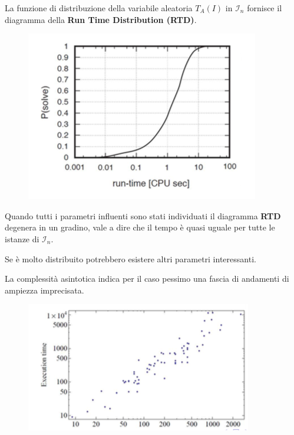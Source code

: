 \documentclass[\main/main.tex]{subfiles}
\begin{document}
\begin{multicols}{2}
\begin{definition}
    La funzione di distribuzione della variabile aleatoria \(T_A(I)\) in \(\mathcal{I}_n\) fornisce il diagramma della \textbf{Run Time Distribution (RTD)}.

    \begin{figure}
        \centering
        \includegraphics[width=\textwidth]{images/RTD.png}
    \end{figure}
    
    Quando tutti i parametri influenti sono stati individuati il diagramma \textbf{RTD} degenera in un gradino, vale a dire che il tempo è quasi uguale per tutte le istanze di \(\mathcal{I}_n\).
    
    Se è molto distribuito potrebbero esistere altri parametri interessanti.
\end{definition}
\begin{definition}
    La complessità asintotica indica per il caso pessimo una fascia di andamenti di ampiezza imprecisata.
    
    \begin{figure}
        \centering
        \includegraphics[width=\textwidth]{images/scaling.png}
    \end{figure}
    

\end{definition}
\end{multicols}
\end{document}
